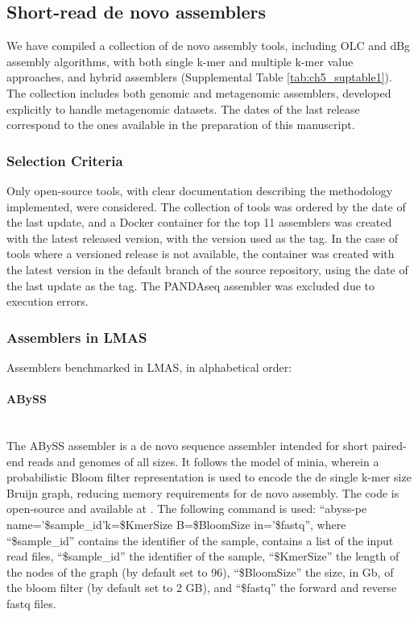 \subsection{Short-read de novo assemblers} \label{ch5_sup_assemblers}

We have compiled a collection of de novo assembly tools, including \ac{OLC} and \ac{dBg} assembly algorithms, with both single k-mer and multiple k-mer value approaches, and hybrid assemblers (Supplemental Table \ref{tab:ch5_suptable1}). The collection includes both genomic and metagenomic assemblers, developed explicitly to handle metagenomic datasets. The dates of the last release correspond to the ones available in the preparation of this manuscript.

\subsubsection{Selection Criteria}

Only open-source tools, with clear documentation describing the methodology implemented, were considered. The collection of tools was ordered by the date of the last update, and a Docker container \cite{noauthor_docker_nodate} for the top 11 assemblers was created with the latest released version, with the version used as the tag. In the case of tools where a versioned release is not available, the container was created with the latest version in the default branch of the source repository, using the date of the last update as the tag. The PANDAseq \cite{masella_pandaseq_2012} assembler was excluded due to execution errors. 

\subsubsection{Assemblers in LMAS}

Assemblers benchmarked in LMAS, in alphabetical order:

\paragraph{ABySS} \mbox{}\\

The ABySS assembler \cite{jackman_abyss_2017} is a de novo sequence assembler intended for short paired-end reads and genomes of all sizes. It follows the model of minia, wherein a probabilistic Bloom filter representation is used to encode the de single k-mer size Bruijn graph, reducing memory requirements for de novo assembly. The code is open-source and available at \cite{noauthor_abyss_2022}. The following command is used: “abyss-pe name='\$sample\_id'k=\$KmerSize B=\$BloomSize in='\$fastq”, where “\$sample\_id” contains the identifier of the sample,  contains a list of the input read files, “\$sample\_id” the identifier of the sample, “\$KmerSize” the length of the nodes of the graph (by default set to 96), “\$BloomSize” the size, in Gb, of the bloom filter (by default set to 2 GB), and “\$fastq” the forward and reverse fastq files. 

